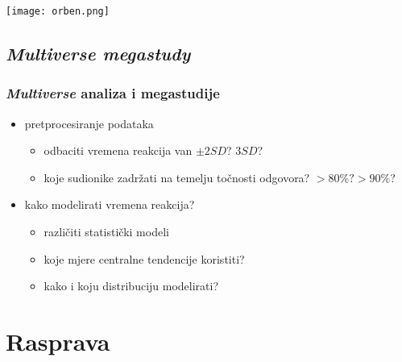 \documentclass[aspectratio=169]{beamer}
\newcommand{\tinycitep}[1]{%
    \bgroup
    \scriptsize
    \citep{#1}
    \egroup}
\begin{document}
\begin{frame}
    \centering
    \texttt{[image: orben.png]}

    \tinycitep{orbenAssociationAdolescentWellbeing2019}
\end{frame}

\subsection{\textit{Multiverse megastudy}}

\begin{frame}
    \frametitle{\textit{Multiverse} analiza i megastudije}

    \begin{itemize}
        \item pretprocesiranje podataka
            \begin{itemize}
                \item odbaciti vremena reakcija van \(\pm 2 SD\)? \(3 SD\)?
                \item koje sudionike zadržati na temelju točnosti odgovora?
                    \(>80\%? >90\%\)?
            \end{itemize}

        \pause

        \item kako modelirati vremena reakcija?
            \begin{itemize}
                \item različiti statistički modeli

                \pause

                \item koje mjere centralne tendencije koristiti?
                    \tinycitep{rousseletReactionTimesOther2020}

                \pause

                \item kako i koju distribuciju modelirati?
                    \tinycitep{balotaMovingMeanStudies2011}

            \end{itemize}
    \end{itemize}
\end{frame}

\section{Rasprava}
\end{document}
